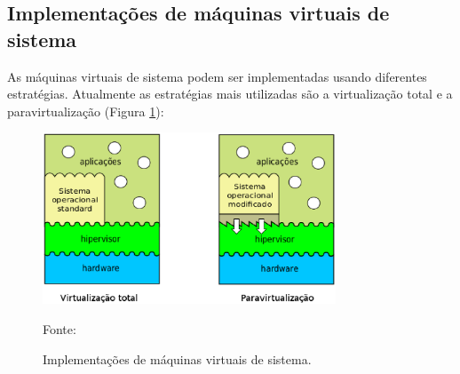 

\newpage
\subsection{Implementações de máquinas virtuais de sistema}
\label{section:virtestrat}

As máquinas virtuais de sistema podem ser implementadas usando diferentes estratégias. Atualmente as estratégias mais utilizadas
são a virtualização total e a paravirtualização (Figura \ref{fig:vms_implementacao}):

\begin{figure}[h!]
 \centering
 \includegraphics[width=330px]{img/vms_implementacao.eps}
 \caption{Implementações de máquinas virtuais de sistema.}
 \label{fig:vms_implementacao}
 Fonte: \citet{maziero2013}
\end{figure}

